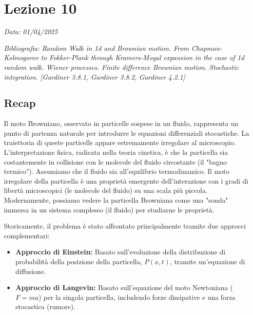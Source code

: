 \chapter{Lezione 10}
\label{chap:lezione_10} %

\begin{flushright}
\textit{Data: 01/04/2025}
\end{flushright}
\textit{Bibliografia: 
Random Walk in 1d and Brownian motion. From Chapman-Kolmogorov to Fokker-Plank through Kramers-Moyal expansion in the case of 1d random walk. Wiener processes. Finite difference Brownian motion. Stochastic integration. [Gardiner 3.8.1, Gardiner 3.8.2, Gardiner 4.2.1]}

\section*{Recap}
Il moto Browniano, osservato in particelle sospese in un fluido, rappresenta un punto di partenza naturale per introdurre le equazioni differenziali stocastiche. La traiettoria di queste particelle appare estremamente irregolare al microscopio. L'interpretazione fisica, radicata nella teoria cinetica, è che la particella sia costantemente in collisione con le molecole del fluido circostante (il "bagno termico"). Assumiamo che il fluido sia all'equilibrio termodinamico. Il moto irregolare della particella è una proprietà emergente dell'interazione con i gradi di libertà microscopici (le molecole del fluido) su una scala più piccola. Modernamente, possiamo vedere la particella Browniana come una "sonda" immersa in un sistema complesso (il fluido) per studiarne le proprietà.

Storicamente, il problema è stato affrontato principalmente tramite due approcci complementari:

\begin{tcolorbox}[colback=colorA!5,colframe=colorA, arc=3mm, boxrule=1.2pt]
\begin{itemize}
    \item \textbf{Approccio di Einstein:} Basato sull'evoluzione della distribuzione di probabilità della posizione della particella, $P(x,t)$, tramite un'equazione di diffusione.
    \item \textbf{Approccio di Langevin:} Basato sull'equazione del moto Newtoniana ($F=ma$) per la singola particella, includendo forze dissipative e una forza stocastica (rumore).
\end{itemize}
\end{tcolorbox}

